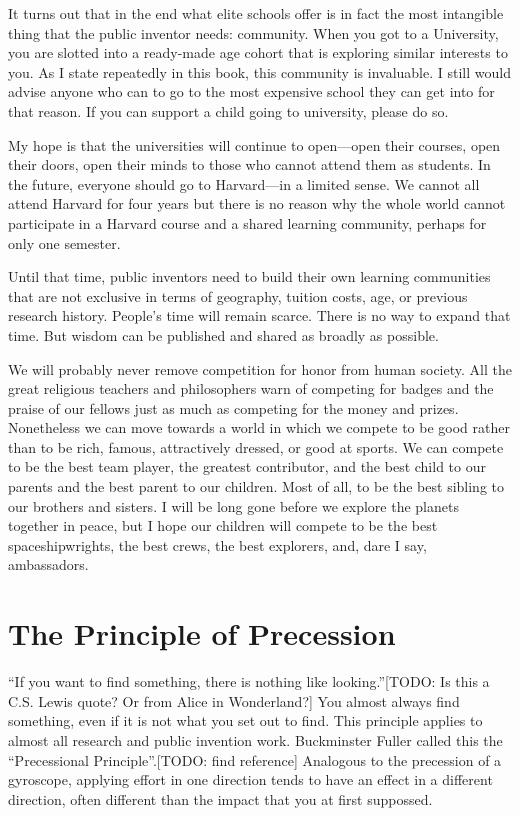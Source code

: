 \documentclass[
	fontsize=10pt, %
	twoside=false, %
	secnumdepth=1, %
]{kaobook}
\begin{document}
It turns out that in the end what elite schools offer is in fact the most
intangible thing that the public inventor needs: community.
When you got to a University, you are slotted into a ready-made age cohort
that is exploring similar interests to you.
As I state repeatedly in this book, this community is invaluable.
I still would advise anyone who can to go to the most expensive school they
can get into for that reason.
If you can support a child going to university, please do so.

My hope is that the universities will continue to open---open their courses,
open their doors, open their minds to those who cannot attend them as students.
In the future, everyone should go to Harvard---in a limited sense.
We cannot all attend Harvard for four years but there is no reason why the
whole world cannot participate in a Harvard course and a shared learning community,
perhaps for only one semester.

Until that time, public inventors need to build their own learning communities that
are not exclusive in terms of geography, tuition costs, age, or previous research history.
People's time will remain scarce. There is no way to expand that time. But wisdom
can be published and shared as broadly as possible.

We will probably never remove competition for honor
from human society. All the great religious
teachers and philosophers warn of competing for badges and the
praise of our fellows just as much as competing for the
money and prizes.
Nonetheless we can move towards a world in which we compete
to be good rather than to be rich, famous,
attractively dressed, or good at sports.
We can compete to be the best team player,
the greatest contributor, and
the best child to our parents and the best parent to
our children.
Most of all, to be the best sibling to our brothers and sisters.
I will be long gone before we explore the planets together in
peace, but I hope our children will compete to be the best
spaceshipwrights, the best crews, the best explorers,
and, dare I say, ambassadors.

\section{The Principle of Precession}

``If you want to find something, there is nothing like looking.''[TODO: Is this a C.S. Lewis quote? Or from Alice in Wonderland?]
You almost always find something, even if it is not what you set out to find.
This principle applies to almost all research and public invention work.
Buckminster Fuller called this the ``Precessional Principle''.[TODO: find reference]
Analogous to the precession of a gyroscope, applying effort in
one direction tends to have an effect in a different direction,
often different than the impact that you at first suppossed.
\end{document}
